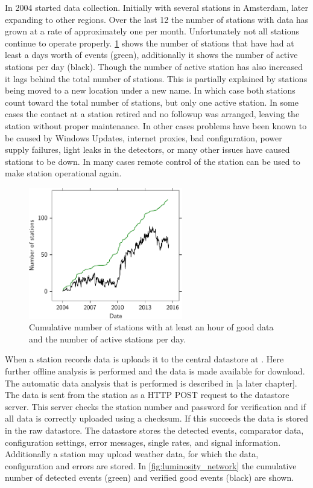 In 2004 \hisparc started data collection. Initially with several stations in Amsterdam, later expanding to other regions. Over the last \SI{12}{\year} the number of stations with data has grown at a rate of approximately one per month. Unfortunately not all stations continue to operate properly. \cref{fig:active_stations} shows the number of stations that have had at least a days worth of events (green), additionally it shows the number of active stations per day (black). Though the number of active station has also increased it lags behind the total number of stations. This is partially explained by stations being moved to a new location under a new name. In which case both stations count toward the total number of stations, but only one active station. In some cases the contact at a station retired and no followup was arranged, leaving the station without proper maintenance. In other cases problems have been known to be caused by Windows Updates, internet proxies, bad configuration, power supply failures, light leaks in the detectors, or many other issues have caused stations to be down. In many cases remote control of the station can be used to make station operational again.

\begin{figure}
    \centering
    \includegraphics[width=0.6\textwidth]
                    {plots/experiment/active_stations}
    \caption{Cumulative number of stations with at least an hour of good data and the number of active stations per day.}
    \label{fig:active_stations}
\end{figure}

When a station records data is uploads it to the central datastore at \nikhef. Here further offline analysis is performed and the data is made available for download. The automatic data analysis that is performed is described in [a later chapter]. The data is sent from the station as a HTTP POST request to the datastore server. This server checks the station number and password for verification and if all data is correctly uploaded using a checksum. If this succeeds the data is stored in the raw datastore. The datastore stores the detected events, comparator data, configuration settings, error messages, single rates, and \gps signal information. Additionally a station may upload weather data, for which the data, configuration and errors are stored. In \cref{fig:luminosity_network} the cumulative number of detected events (green) and verified good events (black) are shown.

